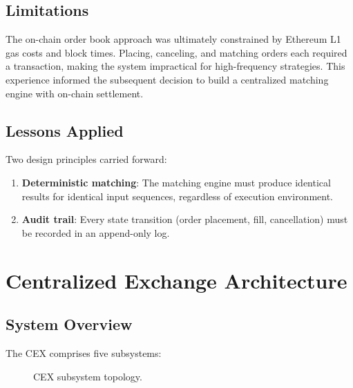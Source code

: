 \documentclass[11pt,a4paper]{article}
\begin{document}
\subsection{Limitations}

The on-chain order book approach was ultimately constrained by Ethereum L1 gas costs and block times. Placing, canceling, and matching orders each required a transaction, making the system impractical for high-frequency strategies. This experience informed the subsequent decision to build a centralized matching engine with on-chain settlement.

\subsection{Lessons Applied}

Two design principles carried forward:
\begin{enumerate}
    \item \textbf{Deterministic matching}: The matching engine must produce identical results for identical input sequences, regardless of execution environment.
    \item \textbf{Audit trail}: Every state transition (order placement, fill, cancellation) must be recorded in an append-only log.
\end{enumerate}

\section{Centralized Exchange Architecture}

\subsection{System Overview}

The CEX comprises five subsystems:

\begin{figure}[h]
\centering
{}
\caption{CEX subsystem topology.}
\end{figure}
\end{document}
